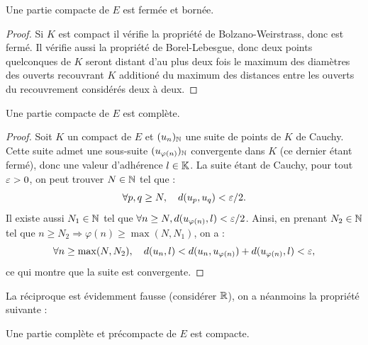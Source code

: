 \begin{coro}
Une partie compacte de $E$ est fermée et bornée.
\end{coro}

\begin{proof}
Si $K$ est compact il vérifie la propriété de Bolzano-Weirstrass, donc est fermé. 
Il vérifie aussi la propriété de Borel-Lebesgue, donc deux points quelconques de $K$ seront distant d'au plus deux fois le maximum
des diamètres des ouverts recouvrant $K$ additioné du maximum des distances entre les ouverts du recouvrement considérés deux à
deux. 
\end{proof}

\begin{coro}
Une partie compacte de $E$ est complète.
\end{coro}

\begin{proof}
Soit $K$ un compact de $E$ et $(u_n)_{\mathbb{N}}$ une suite de points de $K$ de Cauchy. Cette suite admet une sous-suite $(u_{\varphi(n)})_{\mathbb{N}}$
convergente dans $K$ (ce dernier étant fermé), donc une valeur d'adhérence $l \in \mathbb{K}$.
La suite étant de Cauchy, pour tout $\varepsilon >0$, on peut trouver $N \in \mathbb{N}$ tel que : 
\[ \forall p, q \geq N, \quad d(u_p, u_q) < \varepsilon/2 . \]
Il existe aussi $N_1 \in \mathbb{N}$ tel que $\forall n \geq N, d(u_{\varphi(n)}, l) < \varepsilon/2$.
Ainsi, en prenant $N_2 \in \mathbb{N}$ tel que $n \geq N_2 \Rightarrow \varphi(n) \geq \max(N, N_1)$, on a :
\[ \forall n \geq \max(N, N_2), \quad d(u_n, l) < d(u_n, u_{\varphi(n)}) + d(u_{\varphi(n)}, l) < \varepsilon , \]
ce qui montre que la suite est convergente.
\end{proof}

La réciproque est évidemment fausse (considérer $\mathbb{R}$), on a néanmoins la propriété suivante :

\begin{thm}
Une partie complète et précompacte de $E$ est compacte.
\end{thm}

